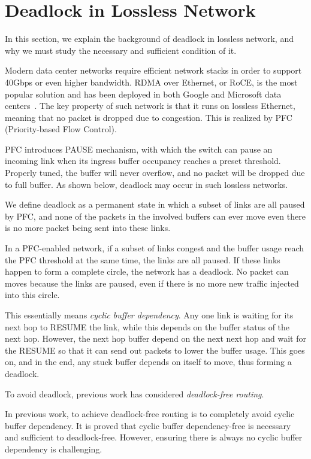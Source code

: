 \section{Deadlock in Lossless Network}

In this section, we explain the background of deadlock in lossless network, and 
why we must study the necessary and sufficient condition of it.

Modern data center networks require efficient network stacks in order to support 
40Gbps or even higher bandwidth. RDMA over Ethernet, or RoCE, is the most popular
solution and has been deployed in both Google and Microsoft data centers~\cite{dcqcn, timely}.
The key property of such network is that it runs on lossless Ethernet, meaning
that no packet is dropped due to congestion. This is realized by PFC 
(Priority-based Flow Control).

PFC introduces PAUSE mechanism, with which the switch can pause an incoming link
when its ingress buffer occupancy reaches a preset threshold. Properly tuned, the 
buffer will never overflow, and no packet will be dropped due to full buffer.
As shown below, deadlock may occur in such lossless networks.


We define deadlock as a permanent state in which a subset of links are all paused
by PFC, and none of the packets in the involved buffers can ever move even there is 
no more packet being sent into these links.

In a PFC-enabled network, if a subset of links congest and the buffer usage reach
the PFC threshold at the same time, the links are all paused. If these links happen
to form a complete circle, the network has a deadlock. No packet can moves because 
the links are paused, even if there is no more new traffic injected into this circle.

This essentially means {\em cyclic buffer dependency}. Any one link is waiting for its next
hop to RESUME the link, while this depends on the buffer status of the next hop. However,
the next hop buffer depend on the next next hop and wait for the RESUME
so that it can send out packets to lower the buffer usage. This goes on, and in the end, 
any stuck buffer depends on itself to move, thus forming a deadlock.

To avoid deadlock, previous work has considered {\em deadlock-free routing}.

In previous work, to achieve deadlock-free routing is to completely avoid cyclic buffer dependency.
It is proved that cyclic buffer dependency-free is necessary and sufficient to deadlock-free.
However, ensuring there is always no cyclic buffer dependency is challenging.

